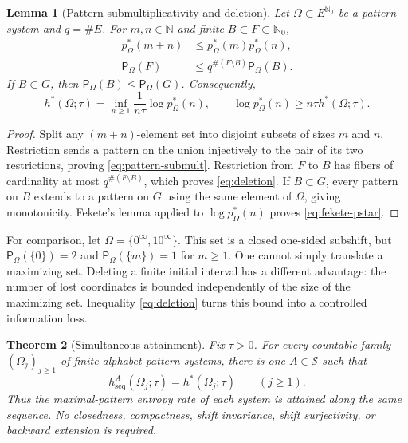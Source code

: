 \documentclass[11pt,reqno]{amsart}
\numberwithin{equation}{section}
\newtheorem{theorem}{Theorem}[section]
\newtheorem{lemma}[theorem]{Lemma}
\theoremstyle{definition}
\newcommand{\N}{\mathbb N}
\newcommand{\Nzero}{\mathbb N_0}
\newcommand{\Patt}{\mathsf P}
\newcommand{\hseq}{h_{\mathrm{seq}}}
\newcommand{\hpat}{h^{*}}
\begin{document}
\begin{lemma}[Pattern submultiplicativity and deletion]\label{lem:pattern-submult}
Let $\Omega\subset E^{\Nzero}$ be a pattern system and $q=\#E$.
For $m,n\in\N$ and finite $B\subset F\subset\Nzero$,
\begin{align}
 p_\Omega^*(m+n)&\le p_\Omega^*(m)p_\Omega^*(n),
 \label{eq:pattern-submult}\\
 \Patt_\Omega(F)&\le q^{\#(F\setminus B)}\Patt_\Omega(B).
 \label{eq:deletion} 
\end{align}
If $B\subset G$, then $\Patt_\Omega(B)\le\Patt_\Omega(G)$.
Consequently,
\begin{equation}\label{eq:fekete-pstar}
 \hpat(\Omega;\tau)
 =\inf_{n\ge1}\frac1{n\tau}\log p_\Omega^*(n),
 \qquad
 \log p_\Omega^*(n)\ge n\tau\hpat(\Omega;\tau).
\end{equation}
\end{lemma}

\begin{proof}
Split any $(m+n)$-element set into disjoint subsets of sizes $m$ and $n$.
Restriction sends a pattern on the union injectively to the pair of its two
restrictions, proving \eqref{eq:pattern-submult}.  Restriction from $F$ to
$B$ has fibers of cardinality at most $q^{\#(F\setminus B)}$, which proves
\eqref{eq:deletion}.  If $B\subset G$, every pattern on $B$ extends to a
pattern on $G$ using the same element of $\Omega$, giving monotonicity.
Fekete's lemma applied to $\log p_\Omega^*(n)$ proves
\eqref{eq:fekete-pstar}.
\end{proof}

For comparison, let $\Omega=\{0^\infty,10^\infty\}$. This set is a
closed one-sided subshift, but
$\Patt_\Omega(\{0\})=2$ and $\Patt_\Omega(\{m\})=1$ for $m\ge1$.
One cannot simply translate a maximizing set. Deleting a finite initial
interval has a different advantage: the number of lost coordinates is
bounded independently of the size of the maximizing set. Inequality
\eqref{eq:deletion} turns this bound into a controlled information loss.

\begin{theorem}[Simultaneous attainment]\label{thm:A}
Fix $\tau>0$.  For every countable family
$(\Omega_j)_{j\ge1}$ of finite-alphabet pattern systems, there is one
$A\in\mathscr S$ such that
\begin{equation}\label{eq:simultaneous-attainment}
 \hseq^A(\Omega_j;\tau)=\hpat(\Omega_j;\tau)
 \qquad(j\ge1).
\end{equation}
Thus the maximal-pattern entropy rate of each system is attained along the same
sequence.  No closedness, compactness, shift invariance, shift surjectivity, or
backward extension is required.
\end{theorem}
\end{document}
